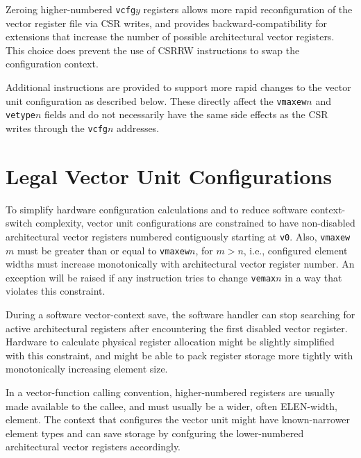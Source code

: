\begin{commentary}
  Zeroing higher-numbered {\tt vcfg}$y$ registers allows more rapid
  reconfiguration of the vector register file via CSR writes, and
  provides backward-compatibility for extensions that increase the
  number of possible architectural vector registers.  This choice does
  prevent the use of CSRRW instructions to swap the configuration
  context.
\end{commentary}

\begin{commentary}
Additional instructions are provided to support more rapid changes to
the vector unit configuration as described below. These directly
affect the {\tt vmaxew}$n$ and {\tt vetype}$n$ fields and do not
necessarily have the same side effects as the CSR writes through the
{\tt vcfg}$n$ addresses.
\end{commentary}


\section{Legal Vector Unit Configurations}

To simplify hardware configuration calculations and to reduce software
context-switch complexity, vector unit configurations are constrained
to have non-disabled architectural vector registers numbered
contiguously starting at {\tt v0}.  Also, {\tt vmaxew}$m$ must be
greater than or equal to {\tt vmaxew}$n$, for $m > n$, i.e.,
configured element widths must increase monotonically with
architectural vector register number.  An exception will be raised if
any instruction tries to change {\tt vemax}$n$ in a way that violates
this constraint.

\begin{commentary}
  During a software vector-context save, the software handler can stop
  searching for active architectural registers after encountering the
  first disabled vector register.  Hardware to calculate physical
  register allocation might be slightly simplified with this
  constraint, and might be able to pack register storage more tightly
  with monotonically increasing element size.

  In a vector-function calling convention, higher-numbered registers
  are usually made available to the callee, and must usually be a
  wider, often ELEN-width, element.  The context that configures the
  vector unit might have known-narrower element types and can save
  storage by confguring the lower-numbered architectural vector
  registers accordingly.
\end{commentary}


